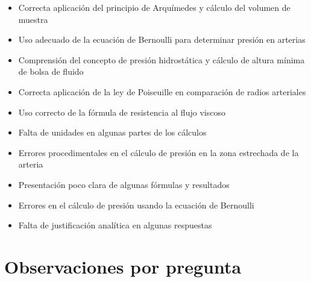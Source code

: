 \documentclass[11pt,a4paper]{article}
\begin{document}
\vspace{4pt}
\begin{minipage}[t]{0.48\linewidth}
  \begin{tcolorbox}[cajaFortaleza, title={Fortalezas}]
\begin{itemize}[leftmargin=1.5em, itemsep=2pt]
  \item Correcta aplicación del principio de Arquímedes y cálculo del volumen de muestra
  \item Uso adecuado de la ecuación de Bernoulli para determinar presión en arterias
  \item Comprensión del concepto de presión hidrostática y cálculo de altura mínima de bolsa de fluido
  \item Correcta aplicación de la ley de Poiseuille en comparación de radios arteriales
  \item Uso correcto de la fórmula de resistencia al flujo viscoso
\end{itemize}
  \end{tcolorbox}
\end{minipage}
\hfill
\begin{minipage}[t]{0.48\linewidth}
  \begin{tcolorbox}[cajaMejora, title={Areas de mejora}]
\begin{itemize}[leftmargin=1.5em, itemsep=2pt]
  \item Falta de unidades en algunas partes de los cálculos
  \item Errores procedimentales en el cálculo de presión en la zona estrechada de la arteria
  \item Presentación poco clara de algunas fórmulas y resultados
  \item Errores en el cálculo de presión usando la ecuación de Bernoulli
  \item Falta de justificación analítica en algunas respuestas
\end{itemize}
  \end{tcolorbox}
\end{minipage}

\section*{Observaciones por pregunta}
\end{document}
